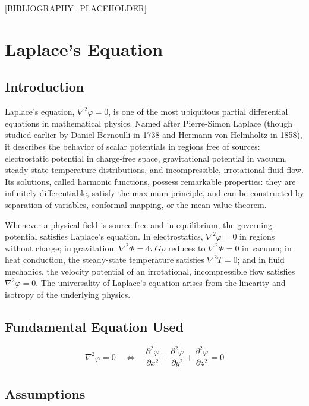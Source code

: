 \documentclass[11pt,openright]{book}
\begin{document}
[BIBLIOGRAPHY_PLACEHOLDER]


\chapter{Laplace's Equation}

\section*{Introduction}

Laplace's equation, $\nabla^{2}\varphi = 0$, is one of the most ubiquitous partial differential equations in mathematical physics. Named after Pierre-Simon Laplace (though studied earlier by Daniel Bernoulli in 1738 and Hermann von Helmholtz in 1858), it describes the behavior of scalar potentials in regions free of sources: electrostatic potential in charge-free space, gravitational potential in vacuum, steady-state temperature distributions, and incompressible, irrotational fluid flow. Its solutions, called harmonic functions, possess remarkable properties: they are infinitely differentiable, satisfy the maximum principle, and can be constructed by separation of variables, conformal mapping, or the mean-value theorem.

Whenever a physical field is source-free and in equilibrium, the governing potential satisfies Laplace's equation. In electrostatics, $\nabla^{2}\varphi = 0$ in regions without charge; in gravitation, $\nabla^{2}\Phi = 4\pi G\rho$ reduces to $\nabla^{2}\Phi = 0$ in vacuum; in heat conduction, the steady-state temperature satisfies $\nabla^{2}T = 0$; and in fluid mechanics, the velocity potential of an irrotational, incompressible flow satisfies $\nabla^{2}\varphi = 0$. The universality of Laplace's equation arises from the linearity and isotropy of the underlying physics.
\section*{Fundamental Equation Used}

\begin{equation}
\boxed{\; \nabla^{2}\varphi = 0 \quad\Longleftrightarrow\quad \frac{\partial^{2}\varphi}{\partial x^{2}} + \frac{\partial^{2}\varphi}{\partial y^{2}} + \frac{\partial^{2}\varphi}{\partial z^{2}} = 0\;}
\label{eq:laplace}
\end{equation}
\section*{Assumptions}
\end{document}
